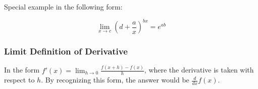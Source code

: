 Special example in the following form:

\[\lim_{x\to{c}}(d+\frac{a}{x})^{bx}=e^{ab}\]

\subsubsection{Limit Definition of Derivative}

In the form $f'(x)=\lim_{h\to{0}}\frac{f(x+h)-f(x)}{h}$, 
where the derivative is taken with respect to $h$.
By recognizing this form, the answer would be $\frac{d}{dx}f(x)$.